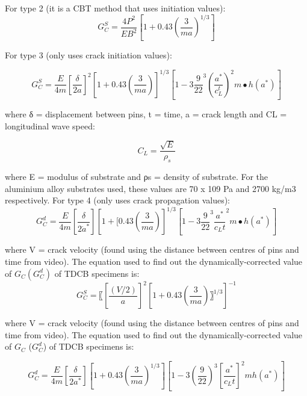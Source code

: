 \documentclass[numbers=noendperiod,chapterprefix=on]{icldt} %
\begin{document}
For type 2 (it is a CBT method that uses initiation values):
\begin{equation} 
G_C^S=\frac{4P^2}{EB^2}\left[1+0.43\left(\frac{3}{ma}\right) ^{1/3} \right]
\end{equation}

For type 3 (only uses crack initiation values):

\begin{equation} 
G_C^S= \frac{E}{4m}\left[\frac{\delta}{2a}\right]^2 \left[1+0.43(\frac{3}{ma})\right]^{1/3} \left[1-3\frac{9}{22}^3 \left(\frac{a^*}{c_L^{ t}}\right) ^2 m∙h(a^*)\right]
\end{equation}

where δ = displacement between pins, t = time, a = crack length and CL = longitudinal wave speed:

\begin{equation} 
C_L= \frac{\sqrt{E}}{\rho_s}
\end{equation}

where E = modulus of substrate and ρs = density of substrate. For the aluminium alloy substrates used, these values are 70 x 109 Pa and 2700 kg/m3 respectively. 
For type 4 (only uses crack propagation values):
\begin{equation} 
G_C^d=  \frac{E}{4m} \left[\frac{\delta}{2\dot{a}^\ast}\right]\left[1+[0.43\left( \frac{3}{ma}\right) \right]^{1/3}\left[1-3\frac{9}{22}^3 {\frac{a^\ast}{c_L t}}^2 m∙h(a^\ast)\right] 
\end{equation}

where V = crack velocity (found using the distance between centres of pins and time from video). The equation used to find out the dynamically-corrected value of $G_C (G^d_C)$ of TDCB specimens is:
\begin{equation} 
G_C^S=〖\left[\frac{(V/2)}{a}\right]^2 \left[1+0.43\left(\frac{3}{ma}\right) 〗^{1/3}\right]^{-1}
\end{equation}

where V = crack velocity (found using the distance between centres of pins and time from video). The equation used to find out the dynamically-corrected value of $G_C$ ($G^d_C$) of TDCB specimens is: 

\begin{equation} 
G_C^d= \frac{E}{4m}  
\left[\frac{\delta}{2a^\ast}\right]
\left[1 +0.43\left( \frac{3}{ma}\right)^{1/3} \right] 
\left[1-3\left( \frac{9}{22}\right) ^3 \left[\frac{a^\ast}{c_L t}\right]^2mh(a^\ast)\right]
\end{equation}
\end{document}

